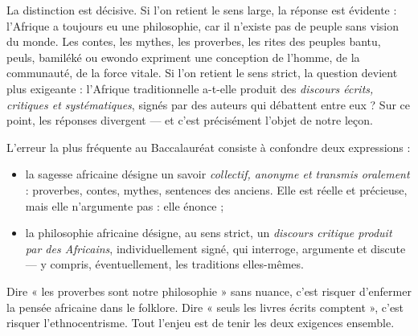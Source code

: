 \documentclass[11pt]{article}
\newcommand{\cle}[1]{{\popxbold\color{popdark}#1}}
\begin{document}
La distinction est décisive. Si l'on retient le sens large, la réponse est évidente : l'Afrique a toujours eu une philosophie, car il n'existe pas de peuple sans vision du monde. Les contes, les mythes, les proverbes, les rites des peuples bantu, peuls, bamiléké ou ewondo expriment une conception de l'homme, de la communauté, de la force vitale. Si l'on retient le sens strict, la question devient plus exigeante : l'Afrique traditionnelle a-t-elle produit des \emph{discours écrits, critiques et systématiques}, signés par des auteurs qui débattent entre eux ? Sur ce point, les réponses divergent — et c'est précisément l'objet de notre leçon.

\begin{attention}
L'erreur la plus fréquente au Baccalauréat consiste à confondre deux expressions :
\begin{itemize}
\item la \cle{sagesse africaine} désigne un savoir \emph{collectif, anonyme et transmis oralement} : proverbes, contes, mythes, sentences des anciens. Elle est réelle et précieuse, mais elle n'argumente pas : elle énonce ;
\item la \cle{philosophie africaine} désigne, au sens strict, un \emph{discours critique produit par des Africains}, individuellement signé, qui interroge, argumente et discute — y compris, éventuellement, les traditions elles-mêmes.
\end{itemize}
Dire « les proverbes sont notre philosophie » sans nuance, c'est risquer d'enfermer la pensée africaine dans le folklore. Dire « seuls les livres écrits comptent », c'est risquer l'ethnocentrisme. Tout l'enjeu est de tenir les deux exigences ensemble.
\end{attention}
\end{document}
